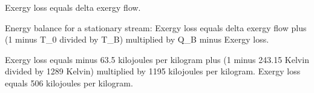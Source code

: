 Exergy loss equals delta exergy flow.  

Energy balance for a stationary stream:  
Exergy loss equals delta exergy flow plus (1 minus T_0 divided by T_B) multiplied by Q_B minus Exergy loss.  

Exergy loss equals minus 63.5 kilojoules per kilogram plus (1 minus 243.15 Kelvin divided by 1289 Kelvin) multiplied by 1195 kilojoules per kilogram.  
Exergy loss equals 506 kilojoules per kilogram.